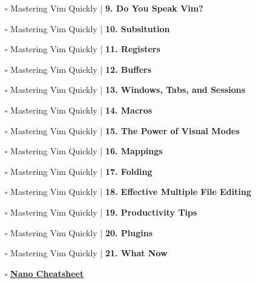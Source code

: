 \documentclass[a4, landscape, 12pt]{article}
\newcommand{\checkbox}{$\square$}%
\begin{document}
\begin{itemize}
{}
\item [\checkbox]  Mastering Vim Quickly | \textbf{ 9. Do You Speak Vim?
}
\item [\checkbox]  Mastering Vim Quickly | \textbf{ 10. Subsitution
}
\item [\checkbox]  Mastering Vim Quickly | \textbf{ 11. Registers
}
\item [\checkbox]  Mastering Vim Quickly | \textbf{ 12. Buffers
}
\item [\checkbox]  Mastering Vim Quickly | \textbf{ 13. Windows, Tabs, and Sessions
}
\item [\checkbox]  Mastering Vim Quickly | \textbf{ 14. Macros
}
\item [\checkbox]  Mastering Vim Quickly | \textbf{ 15. The Power of Visual Modes
}
\item [\checkbox]  Mastering Vim Quickly | \textbf{ 16. Mappings
}
\item [\checkbox]  Mastering Vim Quickly | \textbf{ 17. Folding
}
\item [\checkbox]  Mastering Vim Quickly | \textbf{ 18. Effective Multiple File Editing
}
\item [\checkbox]  Mastering Vim Quickly | \textbf{ 19. Productivity Tips
}
\item [\checkbox]  Mastering Vim Quickly | \textbf{ 20. Plugins
}
\item [\checkbox]  Mastering Vim Quickly | \textbf{ 21. What Now
}
\item [\checkbox]  \href{https://www.nano-editor.org/dist/latest/cheatsheet.html}{\textbf{Nano Cheatsheet}}


\end{itemize}
\end{document}
